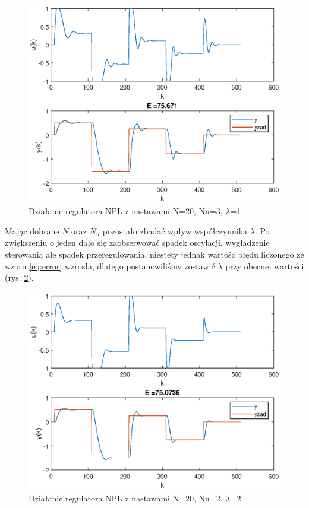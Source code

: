 		\begin{figure}[h!]
			\centering
			\includegraphics[width=\linewidth]{img/NPLNu3.eps}
			\caption{Działanie regulatora NPL z nastawami N=20, Nu=3, $\lambda$=1}
			\label{fig:NPL3}
		\end{figure}
		
		Mając dobrane $N$ oraz $N_u$ pozostało zbadać wpływ współczynnika $\lambda$. Po zwiększeniu o jeden dało się zaobserwować spadek oscylacji, wygładzenie sterowania ale spadek przeregulowania, niestety jednak wartość błędu liczonego ze wzoru \ref{eq:error} wzrosła, dlatego postanowiliśmy zostawić $\lambda$ przy obecnej wartości (rys. \ref{fig:NPL4}).
		\begin{figure}[h!]
			\centering
			\includegraphics[width=\linewidth]{img/NPLlam2.eps}
			\caption{Działanie regulatora NPL z nastawami N=20, Nu=2, $\lambda$=2}
			\label{fig:NPL4}
		\end{figure}
		
